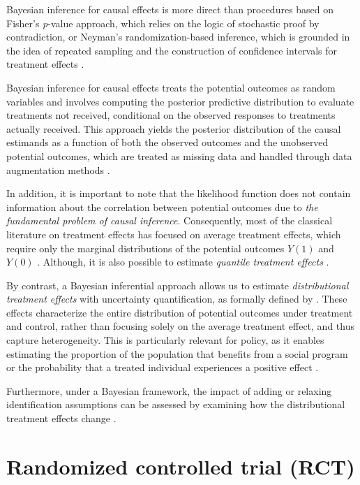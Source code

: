 Bayesian inference for causal effects \cite{rubin1978bayesian} is more direct than procedures based on Fisher's \textit{p}-value approach, which relies on the logic of stochastic proof by contradiction, or Neyman's randomization-based inference, which is grounded in the idea of repeated sampling and the construction of confidence intervals for treatment effects \cite{rubin2004teaching}.

Bayesian inference for causal effects treats the potential outcomes as random variables and involves computing the posterior predictive distribution to evaluate treatments not received, conditional on the observed responses to treatments actually received. This approach yields the posterior distribution of the causal estimands as a function of both the observed outcomes and the unobserved potential outcomes, which are treated as missing data and handled through data augmentation methods \cite{Tanner1987}. 

In addition, it is important to note that the likelihood function does not contain information about the correlation between potential outcomes due to \textit{the fundamental problem of causal inference}. Consequently, most of the classical literature on treatment effects has focused on average treatment effects, which require only the marginal distributions of the potential outcomes $Y(1)$ and $Y(0)$ \cite{heckman2014treatment}. Although, it is also possible to estimate \textit{quantile treatment effects} \cite{AbadieAngristImbens2002,Chernozhukov2005}.

By contrast, a Bayesian inferential approach allows us to estimate \textit{distributional treatment effects} with uncertainty quantification, as formally defined by \cite{aakvik2005estimating,heckman2014treatment}. These effects characterize the entire distribution of potential outcomes under treatment and control, rather than focusing solely on the average treatment effect, and thus capture heterogeneity. This is particularly relevant for policy, as it enables estimating the proportion of the population that benefits from a social program or the probability that a treated individual experiences a positive effect \cite{Ramirez2019a}.

Furthermore, under a Bayesian framework, the impact of adding or relaxing identification assumptions can be assessed by examining how the distributional treatment effects change \cite{imbens1997bayesian}.

\section{Randomized controlled trial (RCT)}

